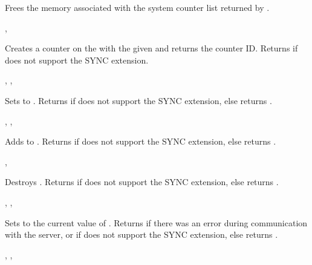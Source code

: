 \cendfunctiondecl

Frees the memory associated with the system counter list returned by
.
\cendfuncdescription

, 
\cendfunctiondecl

Creates a counter on the  with the given 
and returns the counter ID.  Returns  if  does not
support the SYNC extension.
\cendfuncdescription

,
,
\cendfunctiondecl

Sets  to .  Returns 
if  does not support the SYNC extension, else returns .
\cendfuncdescription

,
,
\cendfunctiondecl

Adds  to .  Returns 
if  does not support the SYNC extension, else returns .
\cendfuncdescription

, 
\cendfunctiondecl

Destroys .  Returns  if  does not
support the SYNC extension, else returns .
\cendfuncdescription

,
,
\cendfunctiondecl

Sets  to the current value of
.  Returns  if there was an error during
communication with the server, or if  does not support
the SYNC extension, else returns .
\cendfuncdescription

,
,
\cendfunctiondecl

